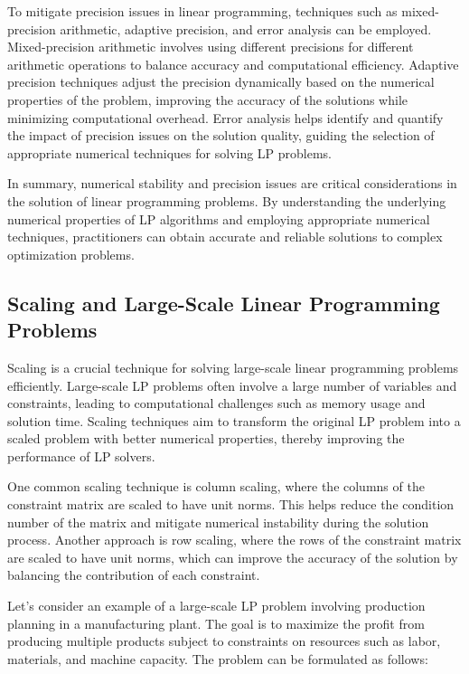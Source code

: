 \documentclass[12pt]{book} %
\begin{document}
To mitigate precision issues in linear programming, techniques such as mixed-precision arithmetic, adaptive precision, and error analysis can be employed. Mixed-precision arithmetic involves using different precisions for different arithmetic operations to balance accuracy and computational efficiency. Adaptive precision techniques adjust the precision dynamically based on the numerical properties of the problem, improving the accuracy of the solutions while minimizing computational overhead. Error analysis helps identify and quantify the impact of precision issues on the solution quality, guiding the selection of appropriate numerical techniques for solving LP problems.

In summary, numerical stability and precision issues are critical considerations in the solution of linear programming problems. By understanding the underlying numerical properties of LP algorithms and employing appropriate numerical techniques, practitioners can obtain accurate and reliable solutions to complex optimization problems.


\subsection{Scaling and Large-Scale Linear Programming Problems}

Scaling is a crucial technique for solving large-scale linear programming problems efficiently. Large-scale LP problems often involve a large number of variables and constraints, leading to computational challenges such as memory usage and solution time. Scaling techniques aim to transform the original LP problem into a scaled problem with better numerical properties, thereby improving the performance of LP solvers.

One common scaling technique is column scaling, where the columns of the constraint matrix are scaled to have unit norms. This helps reduce the condition number of the matrix and mitigate numerical instability during the solution process. Another approach is row scaling, where the rows of the constraint matrix are scaled to have unit norms, which can improve the accuracy of the solution by balancing the contribution of each constraint.

Let's consider an example of a large-scale LP problem involving production planning in a manufacturing plant. The goal is to maximize the profit from producing multiple products subject to constraints on resources such as labor, materials, and machine capacity. The problem can be formulated as follows:
\end{document}
